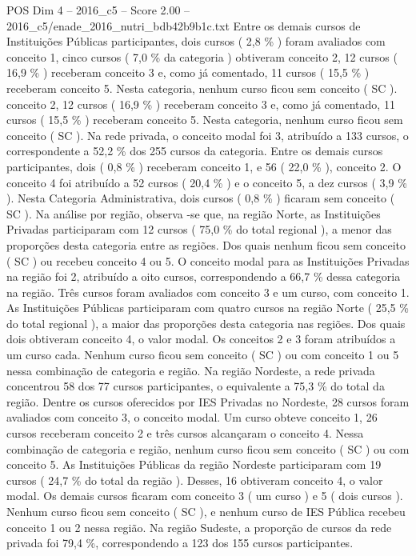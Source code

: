 \begin{textsample}{POS Dim 4 – 2016\_c5 – Score 2.00 – 2016\_c5/enade\_2016\_nutri\_bdb42b9b1c.txt}
Entre os demais cursos de Instituições Públicas participantes, dois cursos ( 2,8 \% ) foram avaliados com conceito 1, cinco cursos ( 7,0 \% da categoria ) obtiveram conceito 2, 12 cursos ( 16,9 \% ) receberam conceito 3 e, como já comentado, 11 cursos ( 15,5 \% ) receberam conceito 5.
Nesta categoria, nenhum curso ficou sem conceito ( SC ). conceito 2, 12 cursos ( 16,9 \% ) receberam conceito 3 e, como já comentado, 11 cursos ( 15,5 \% ) receberam conceito 5.
Nesta categoria, nenhum curso ficou sem conceito ( SC ).
Na rede privada, o conceito modal foi 3, atribuído a 133 cursos, o correspondente a 52,2 \% dos 255 cursos da categoria.
Entre os demais cursos participantes, dois ( 0,8 \% ) receberam conceito 1, e 56 ( 22,0 \% ), conceito 2.
O conceito 4 foi atribuído a 52 cursos ( 20,4 \% ) e o conceito 5, a dez cursos ( 3,9 \% ).
Nesta Categoria Administrativa, dois cursos ( 0,8 \% ) ficaram sem conceito ( SC ).
Na análise por região, observa -se que, na região Norte, as Instituições Privadas participaram com 12 cursos ( 75,0 \% do total regional ), a menor das proporções desta categoria entre as regiões.
Dos quais nenhum ficou sem conceito ( SC ) ou recebeu conceito 4 ou 5.
O conceito modal para as Instituições Privadas na região foi 2, atribuído a oito cursos, correspondendo a 66,7 \% dessa categoria na região.
Três cursos foram avaliados com conceito 3 e um curso, com conceito 1.
As Instituições Públicas participaram com quatro cursos na região Norte ( 25,5 \% do total regional ), a maior das proporções desta categoria nas regiões.
Dos quais dois obtiveram conceito 4, o valor modal.
Os conceitos 2 e 3 foram atribuídos a um curso cada.
Nenhum curso ficou sem conceito ( SC ) ou com conceito 1 ou 5 nessa combinação de categoria e região.
Na região Nordeste, a rede privada concentrou 58 dos 77 cursos participantes, o equivalente a 75,3 \% do total da região.
Dentre os cursos oferecidos por IES Privadas no Nordeste, 28 cursos foram avaliados com conceito 3, o conceito modal.
Um curso obteve conceito 1, 26 cursos receberam conceito 2 e três cursos alcançaram o conceito 4.
Nessa combinação de categoria e região, nenhum curso ficou sem conceito ( SC ) ou com conceito 5.
As Instituições Públicas da região Nordeste participaram com 19 cursos ( 24,7 \% do total da região ).
Desses, 16 obtiveram conceito 4, o valor modal.
Os demais cursos ficaram com conceito 3 ( um curso ) e 5 ( dois cursos ).
Nenhum curso ficou sem conceito ( SC ), e nenhum curso de IES Pública recebeu conceito 1 ou 2 nessa região.
Na região Sudeste, a proporção de cursos da rede privada foi 79,4 \%, correspondendo a 123 dos 155 cursos participantes.

\end{textsample}
